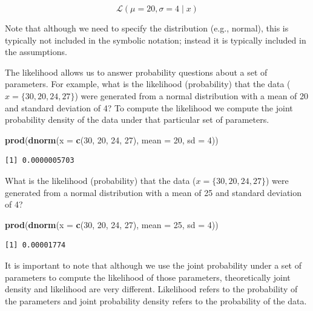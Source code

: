 \documentclass[]{book}
\newenvironment{Shaded}{\begin{snugshade}}{\end{snugshade}}
\newcommand{\DataTypeTok}[1]{\textcolor[rgb]{0.13,0.29,0.53}{#1}}
\newcommand{\DecValTok}[1]{\textcolor[rgb]{0.00,0.00,0.81}{#1}}
\newcommand{\KeywordTok}[1]{\textcolor[rgb]{0.13,0.29,0.53}{\textbf{#1}}}
\newcommand{\NormalTok}[1]{#1}
\begin{document}
\[
\mathcal{L}(\mu = 20, \sigma =4 \mid x)
\]

Note that although we need to specify the distribution (e.g., normal), this is typically not included in the symbolic notation; instead it is typically included in the assumptions.

The likelihood allows us to answer probability questions about a set of parameters. For example, what is the likelihood (probability) that the data (\(x = \{30, 20, 24, 27\}\)) were generated from a normal distribution with a mean of 20 and standard deviation of 4? To compute the likelihood we compute the joint probability density of the data under that particular set of parameters.

\begin{Shaded}
\begin{Highlighting}[]
\KeywordTok{prod}\NormalTok{(}\KeywordTok{dnorm}\NormalTok{(}\DataTypeTok{x =} \KeywordTok{c}\NormalTok{(}\DecValTok{30}\NormalTok{, }\DecValTok{20}\NormalTok{, }\DecValTok{24}\NormalTok{, }\DecValTok{27}\NormalTok{), }\DataTypeTok{mean =} \DecValTok{20}\NormalTok{, }\DataTypeTok{sd =} \DecValTok{4}\NormalTok{))}
\end{Highlighting}
\end{Shaded}

\begin{verbatim}
[1] 0.0000005703
\end{verbatim}

What is the likelihood (probability) that the data (\(x = \{30, 20, 24, 27\}\)) were generated from a normal distribution with a mean of 25 and standard deviation of 4?

\begin{Shaded}
\begin{Highlighting}[]
\KeywordTok{prod}\NormalTok{(}\KeywordTok{dnorm}\NormalTok{(}\DataTypeTok{x =} \KeywordTok{c}\NormalTok{(}\DecValTok{30}\NormalTok{, }\DecValTok{20}\NormalTok{, }\DecValTok{24}\NormalTok{, }\DecValTok{27}\NormalTok{), }\DataTypeTok{mean =} \DecValTok{25}\NormalTok{, }\DataTypeTok{sd =} \DecValTok{4}\NormalTok{))}
\end{Highlighting}
\end{Shaded}

\begin{verbatim}
[1] 0.00001774
\end{verbatim}

It is important to note that although we use the joint probability under a set of parameters to compute the likelihood of those parameters, theoretically joint density and likelihood are very different. Likelihood refers to the probability of the parameters and joint probability density refers to the probability of the data.
\end{document}
